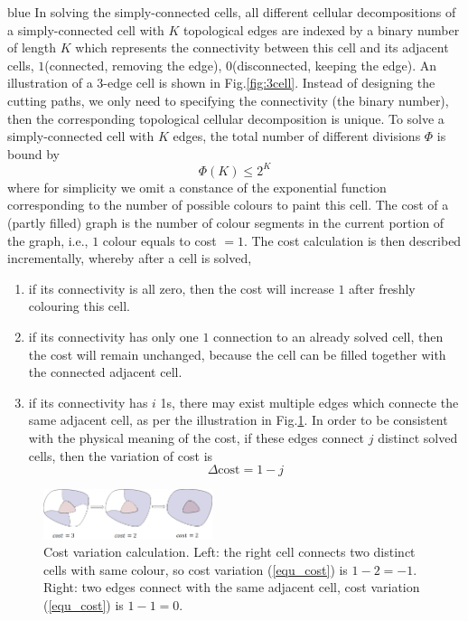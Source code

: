 \documentclass[Afour,sageh,times]{sagej}
\begin{document}
\begin{color}{blue}
In solving the simply-connected cells, all different cellular decompositions of a simply-connected cell with $K$ topological edges are indexed by a binary number of length $K$ which represents the connectivity between this cell and its adjacent cells, $1$(connected, removing the edge), $0$(disconnected, keeping the edge). An illustration of a $3$-edge cell is shown in Fig.\ref{fig:3cell}. 
Instead of designing the cutting paths, we only need to specifying the connectivity (the binary number), then the corresponding topological cellular decomposition is unique. 
To solve a simply-connected cell with $K$ edges, the total number of different divisions $\Phi$ is bound by 
\begin{equation}
\label{equ_Psi}
\Phi(K) \leq 2^K
\end{equation}
where for simplicity we omit a constance of the exponential function corresponding to the number of possible colours to paint this cell. 
The cost of a (partly filled) graph is the number of colour segments in the current portion of the graph, i.e., $1$ colour equals to cost $ = 1$. The cost calculation is then described incrementally, whereby after a cell is solved, 
\begin{enumerate}
\item if its connectivity is all zero, then the cost will increase $1$ after freshly colouring this cell. 
\item if its connectivity has only one $1$ connection to an already solved cell, then the cost will remain unchanged, because the cell can be filled together with the connected adjacent cell. 
\item if its connectivity has $i$ 1s, there may exist multiple edges which connecte the same adjacent cell, as per the illustration in Fig.\ref{fig:cost}. In order to be consistent with the physical meaning of the cost, if these edges connect $j$ distinct solved cells, then the variation of cost is
\begin{equation}\label{equ_cost}
\Delta\mbox{cost} = 1-j
\end{equation}
\end{enumerate}
\begin{figure}[t]
\centering
\includegraphics[width=0.44\textwidth]{figures/TMech_simply_connected_example/cost}
\caption{Cost variation calculation. 
Left: the right cell connects two distinct cells with same colour, so cost variation (\ref{equ_cost}) is $1-2 = -1$. Right: two edges connect with the same adjacent cell, cost variation (\ref{equ_cost}) is $1-1=0$.}\label{fig:cost}
\end{figure}


\end{color}
\end{document}
